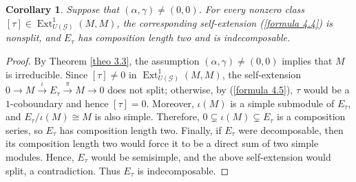 \documentclass[12pt,reqno]{amsart}
\numberwithin{equation}{section}
\newtheorem{coro}[theo]{Corollary}
\begin{document}
\begin{coro}\label{coro 4.5}
    Suppose that $(\alpha,\gamma)\neq(0,0)$.  For every nonzero class $[\tau]\in \operatorname{Ext}^1_{U(\mathcal{G})}(M,M)$, the corresponding self-extension (\ref{formula 4.4}) is nonsplit, and $E_{\tau}$ has composition length two and is indecomposable.
\end{coro}
\begin{proof}
By Theorem \ref{theo 3.3}, the assumption $(\alpha,\gamma)\neq(0,0)$ implies that
$M$ is irreducible. Since $[\tau]\neq0$ in
$\operatorname{Ext}_{U(\mathcal G)}^{1}(M,M)$, the self-extension $0\longrightarrow M\xrightarrow{\iota}E_{\tau}
\xrightarrow{\pi}M\longrightarrow0$
does not split; otherwise, by (\ref{formula 4.5}), $\tau$ would be a $1$-coboundary and
hence $[\tau]=0$.
Moreover, $\iota(M)$ is a simple submodule of $E_{\tau}$, and $E_{\tau}/\iota(M)\cong M$
is also simple. Therefore, $0\subsetneq\iota(M)\subsetneq E_{\tau}$
is a composition series, so $E_{\tau}$ has composition length two.
Finally, if $E_{\tau}$ were decomposable, then its composition length two would force it to be a direct sum of two simple modules. Hence, $E_{\tau}$ would be semisimple, and the above self-extension would split, a contradiction.  Thus $E_{\tau}$ is
indecomposable.
\end{proof}
\end{document}
